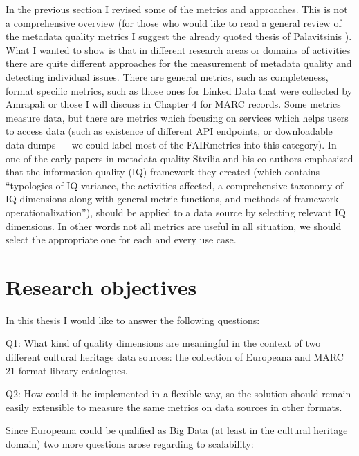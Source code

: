 In the previous section I revised some of the metrics and approaches. This is not a comprehensive overview (for those who would like to read a general review of the metadata quality metrics I suggest the already quoted thesis of Palavitsinis \cite{palavitsinis2014}). What I wanted to show is that in different research areas or domains of activities there are quite different approaches for the measurement of metadata quality and detecting individual issues. There are general metrics, such as completeness, format specific metrics, such as those ones for Linked Data that were collected by Amrapali or those I will discuss in Chapter 4 for MARC records. Some metrics measure data, but there are metrics which focusing on services which helps users to access data (such as existence of different API endpoints, or downloadable data dumps --- we could label most of the FAIRmetrics into this category). In one of the early papers in metadata quality \cite{stvilia2007} Stvilia and his co-authors emphasized that the information quality (IQ) framework they created (which contains ``typologies of IQ variance, the activities affected, a comprehensive taxonomy of IQ dimensions along with general metric functions, and methods of framework operationalization''), should be applied to a data source by selecting relevant IQ dimensions. In other words not all metrics are useful in all situation, we should select the appropriate one for each and every use case.

\section{Research objectives}

In this thesis I would like to answer the following questions:

Q1: What kind of quality dimensions are meaningful in the context of two different cultural heritage data sources: the collection of Europeana and MARC 21 format library catalogues. 

Q2: How could it be implemented in a flexible way, so the solution should remain easily extensible to measure the same metrics on data sources in other formats.

Since Europeana could be qualified as Big Data (at least in the cultural heritage domain) two more questions arose regarding to scalability:

